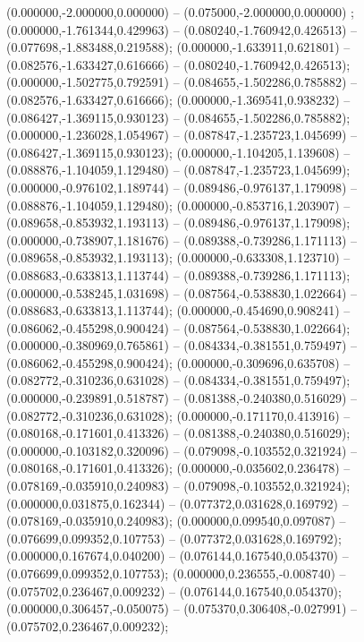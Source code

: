  (0.000000,-2.000000,0.000000) -- (0.075000,-2.000000,0.000000) ;
 (0.000000,-1.761344,0.429963) -- (0.080240,-1.760942,0.426513) -- (0.077698,-1.883488,0.219588);
 (0.000000,-1.633911,0.621801) -- (0.082576,-1.633427,0.616666) -- (0.080240,-1.760942,0.426513);
 (0.000000,-1.502775,0.792591) -- (0.084655,-1.502286,0.785882) -- (0.082576,-1.633427,0.616666);
 (0.000000,-1.369541,0.938232) -- (0.086427,-1.369115,0.930123) -- (0.084655,-1.502286,0.785882);
 (0.000000,-1.236028,1.054967) -- (0.087847,-1.235723,1.045699) -- (0.086427,-1.369115,0.930123);
 (0.000000,-1.104205,1.139608) -- (0.088876,-1.104059,1.129480) -- (0.087847,-1.235723,1.045699);
 (0.000000,-0.976102,1.189744) -- (0.089486,-0.976137,1.179098) -- (0.088876,-1.104059,1.129480);
 (0.000000,-0.853716,1.203907) -- (0.089658,-0.853932,1.193113) -- (0.089486,-0.976137,1.179098);
 (0.000000,-0.738907,1.181676) -- (0.089388,-0.739286,1.171113) -- (0.089658,-0.853932,1.193113);
 (0.000000,-0.633308,1.123710) -- (0.088683,-0.633813,1.113744) -- (0.089388,-0.739286,1.171113);
 (0.000000,-0.538245,1.031698) -- (0.087564,-0.538830,1.022664) -- (0.088683,-0.633813,1.113744);
 (0.000000,-0.454690,0.908241) -- (0.086062,-0.455298,0.900424) -- (0.087564,-0.538830,1.022664);
 (0.000000,-0.380969,0.765861) -- (0.084334,-0.381551,0.759497) -- (0.086062,-0.455298,0.900424);
 (0.000000,-0.309696,0.635708) -- (0.082772,-0.310236,0.631028) -- (0.084334,-0.381551,0.759497);
 (0.000000,-0.239891,0.518787) -- (0.081388,-0.240380,0.516029) -- (0.082772,-0.310236,0.631028);
 (0.000000,-0.171170,0.413916) -- (0.080168,-0.171601,0.413326) -- (0.081388,-0.240380,0.516029);
 (0.000000,-0.103182,0.320096) -- (0.079098,-0.103552,0.321924) -- (0.080168,-0.171601,0.413326);
 (0.000000,-0.035602,0.236478) -- (0.078169,-0.035910,0.240983) -- (0.079098,-0.103552,0.321924);
 (0.000000,0.031875,0.162344) -- (0.077372,0.031628,0.169792) -- (0.078169,-0.035910,0.240983);
 (0.000000,0.099540,0.097087) -- (0.076699,0.099352,0.107753) -- (0.077372,0.031628,0.169792);
 (0.000000,0.167674,0.040200) -- (0.076144,0.167540,0.054370) -- (0.076699,0.099352,0.107753);
 (0.000000,0.236555,-0.008740) -- (0.075702,0.236467,0.009232) -- (0.076144,0.167540,0.054370);
 (0.000000,0.306457,-0.050075) -- (0.075370,0.306408,-0.027991) -- (0.075702,0.236467,0.009232);
